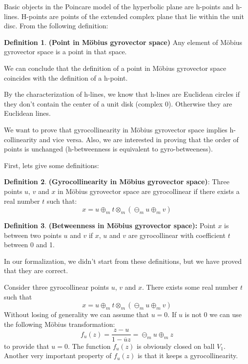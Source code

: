 \documentclass[a4paper]{article}
\theoremstyle{definition}
\newtheorem{definition}{Definition}[section]
\begin{document}
Basic objects in the Poincare model of the hyperbolic plane are h-points and h-lines. H-points are points of the extended complex plane that lie within the unit disc. From the following definition:
\begin{definition}\textbf{(Point in M\" obius gyrovector space)} Any element of M\" obius gyrovector space is a point in that space.
\end{definition}

We can conclude that the definition of a point in M\" obius gyrovector space coincides with the definition of a h-point.

By the characterization of h-lines, we know that h-lines are Euclidean circles if they don't contain the center of a unit disk (complex $0$). Otherwise they are Euclidean lines.

We want to prove that gyrocollinearity in M\" obius gyrovector space implies h-collinearity and vice versa. Also, we are interested in proving that the order of points is unchanged (h-betweenness is equivalent to gyro-betweeness).

First, lets give some definitions:

\begin{definition}\textbf{(Gyrocollinearity in M\" obius gyrovector space)}: Three points $u$, $v$ and $x$ in M\" obius gyrovector space are gyrocollinear if there exists a real number $t$ such that:
$$x = u\oplus_m t \otimes_m (\ominus_m u \oplus_m v)$$
\end{definition}

\begin{definition}\textbf{(Betweenness in M\" obius gyrovector space):} Point $x$ is between two points $u$ and $v$ if $x$, $u$ and $v$ are gyrocollinear with coefficient $t$ between 0 and 1.
\end{definition}

In our formalization, we didn't start from these definitions, but we have proved that they are correct.

Consider three gyrocollinear points $u$, $v$ and $x$. There exists some real number $t$ such that $$x=u\oplus_m t\otimes_m (\ominus_m u \oplus_m v)$$
Without losing of generality we can assume that $u=0$. If $u$ is not $0$ we can use the following M\" obius transformation:
$$f_u(z) = \frac{z-u}{1-\overline{u}z}=\ominus_m u \oplus_m z$$ to provide that $u=0$. The function $f_u(z)$ is obviously closed on ball $V_1$.
Another very important property of $f_u(z)$ is that it keeps a gyrocollinearity.
\end{document}
